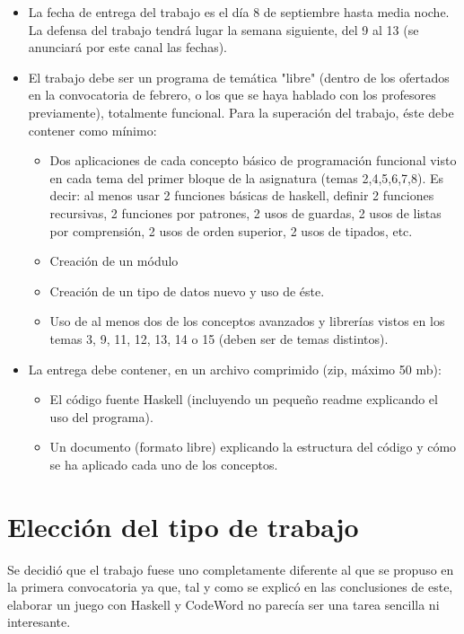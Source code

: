 \documentclass[11pt]{article}
\begin{document}
\begin{itemize}
    \item La fecha de entrega del trabajo es el día 8 de septiembre hasta media noche. La defensa del trabajo tendrá lugar la semana siguiente, del 9 al 13 (se anunciará por este canal las fechas).
    \item El trabajo debe ser un programa de temática "libre" (dentro de los ofertados en la convocatoria de febrero, o los que se haya hablado con los profesores previamente), totalmente funcional. Para la superación del trabajo, éste debe contener como mínimo:
    
    \begin{itemize}
        \item Dos aplicaciones de cada concepto básico de programación funcional visto en cada tema del primer bloque de la asignatura (temas 2,4,5,6,7,8). Es decir: al menos usar 2 funciones básicas de haskell, definir 2 funciones recursivas, 2 funciones por patrones, 2 usos de guardas, 2 usos de listas por comprensión, 2 usos de orden superior, 2 usos de tipados, etc.
    \item Creación de un módulo
    \item Creación de un tipo de datos nuevo y uso de éste.
    \item Uso de al menos dos de los conceptos avanzados y librerías vistos en los temas 3, 9, 11, 12, 13, 14 o 15 (deben ser de temas distintos).
    \end{itemize}
    
    
    \item La entrega debe contener, en un archivo comprimido (zip, máximo 50 mb):
    \begin{itemize}
        \item El código fuente Haskell (incluyendo un pequeño readme explicando el uso del programa).
        \item Un documento (formato libre) explicando la estructura del código y cómo se ha aplicado cada uno de los conceptos.
    \end{itemize}


\end{itemize}

\section{Elección del tipo de trabajo}
Se decidió que el trabajo fuese uno completamente diferente al que se propuso en la primera convocatoria \cite{trabajoPrimeraConv} ya que, tal y como se explicó en las conclusiones de este, elaborar un juego con Haskell y CodeWord no parecía ser una tarea sencilla ni interesante. 
\end{document}
